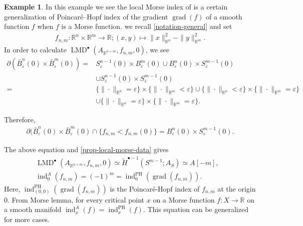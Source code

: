 \documentclass[a4paper,dvipdfmx,reqno,12pt]{amsart}
\theoremstyle{definition}
\newtheorem{example}[theorem]{Example}
\newcommand{\opn}[1]{\operatorname{#1}}
\numberwithin{equation}{section}
\begin{document}
\begin{example}
\label{example-morse-index}
In this example we see
the local Morse index of is a certain generalization of 
Poincar\'e--Hopf index of the gradient 
$\opn{grad}(f)$ of a smooth function $f$ 
when $f$ is a Morse function. 
we recall \cref{notation-general}
and set
\begin{align}
f_{n,m}\colon \mathbb{R}^{n}\times \mathbb{R}^{m}\to \mathbb{R};
(x,y)\mapsto \|x\|_{\mathbb{R}^{n}}^2
-\|y\|_{\mathbb{R}^{m}}^2.
\end{align}
In order to calculate 
$\opn{LMD}^{\bullet}(A_{\mathbb{R}^{n+m}},f_{n,m},0)$, we 
see
\begin{align}
\partial (\bar{B}^{n}_{\varepsilon}(0)
\times \bar{B}^{m}_{\varepsilon}(0))=
& S^{n-1}_{\varepsilon}(0)\times B^{m}_{\varepsilon}(0) 
\cup B^{n}_{\varepsilon}(0)\times S^{m-1}_{\varepsilon}(0) \\
& \cup 
S^{n-1}_{\varepsilon}(0)\times S^{m-1}_{\varepsilon}(0) \\
=& \{\|\cdot\|_{\mathbb{R}^{n}}=\varepsilon\} 
\times \{\|\cdot\|_{\mathbb{R}^{m}} < \varepsilon\} 
\cup \{\|\cdot\|_{\mathbb{R}^{n}} < \varepsilon\} \times 
\{\|\cdot\|_{\mathbb{R}^{m}}= \varepsilon\} \\
& \cup 
\{\|\cdot\|_{\mathbb{R}^{n}}=\varepsilon\} \times 
\{\|\cdot\|_{\mathbb{R}^{m}}= \varepsilon\}.
\end{align}

Therefore,  
\begin{align}
\partial (\bar{B}^{n}_{\varepsilon}(0)
\times \bar{B}^{m}_{\varepsilon}(0)\cap 
\{f_{n,m}<f_{n,m}(0)\}
= B^{n}_{\varepsilon}(0)\times S^{m-1}_{\varepsilon}(0).
\end{align}

The above equation and \cref{prop-local-morse-data} 
gives
\begin{align}
\opn{LMD}^{\bullet}(A_{\mathbb{R}^{n+m}},f_{n,m},0)\simeq 
\tilde{H}^{\bullet-1}(S^{m-1};A_S) \simeq A[-m],& \\
\opn{ind}^{A}_{0}(f_{n,m})=(-1)^{m}=
\opn{ind}^{\opn{PH}}_{0}(\opn{grad}(f_{n,m})).&
\end{align}
Here, $\opn{ind}^{\opn{PH}}_{(0,0)}(\opn{grad}(f_{n,m}))$ is 
the Poincar\'e-Hopf index of $f_{n,m}$ at 
the origin $0$.
From Morse lemma,
for every critical point $x$ on a Morse function 
$f\colon X\to \mathbb{R}$ on a smooth manifold 
$\opn{ind}_x^{A}(f)=\opn{ind}^{\opn{PH}}_x(f)$. 
This equation can be generalized for more cases.
\end{example}
\end{document}
